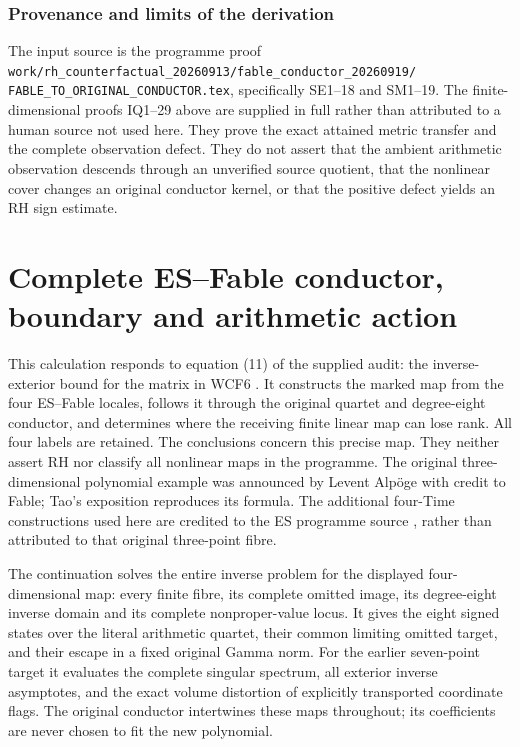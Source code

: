 \section{Provenance and limits of the derivation}
The input source is the programme proof
\texttt{work/rh\_counterfactual\_20260913/fable\_conductor\_20260919/}
\texttt{FABLE\_TO\_ORIGINAL\_CONDUCTOR.tex}, specifically SE1--18 and
SM1--19.  The finite-dimensional proofs IQ1--29 above are supplied in
full rather than attributed to a human source not used here.  They
prove the exact attained metric transfer and the complete observation
defect.  They do not assert that the ambient arithmetic observation
descends through an unverified source quotient, that the nonlinear
cover changes an original conductor kernel, or that the positive
defect yields an RH sign estimate.

\endgroup


\clearpage\begingroup
\part*{Complete ES--Fable conductor, boundary and arithmetic action}
\newtheorem{fullfableproposition}{Proposition}
\newtheorem{fullfabletheorem}{Theorem}
\newcommand{\fullfableC}{\mathbb C}
\newcommand{\fullfableR}{\mathbb R}
\newcommand{\fullfablediag}{\operatorname{diag}}
\newcommand{\fullfableord}{\operatorname{ord}}
\newcommand{\fullfablerank}{\operatorname{rank}}
\newcommand{\fullfabletr}{\operatorname{tr}}



This calculation responds to equation (11) of the supplied audit: the
inverse-exterior bound for the matrix in WCF6 \cite{fullfable:WCF}. It constructs
the marked map from the four ES--Fable locales, follows it through the
original quartet and degree-eight conductor, and determines where the
receiving finite linear map can lose rank. All four labels are retained.
The conclusions concern this precise map. They neither assert RH nor
classify all nonlinear maps in the programme.
The original three-dimensional polynomial example was announced by
Levent Alp\"oge with credit to Fable; Tao's exposition \cite{fullfable:Tao}
reproduces its formula. The additional four-Time constructions used here
are credited to the ES programme source \cite{fullfable:ES}, rather than attributed
to that original three-point fibre.

The continuation solves the entire inverse problem for the displayed
four-dimensional map: every finite fibre, its complete omitted image,
its degree-eight inverse domain and its complete nonproper-value locus.
It gives the eight signed states over the literal arithmetic quartet,
their common limiting omitted target, and their escape in a fixed
original Gamma norm. For the earlier seven-point target it evaluates
the complete singular spectrum, all exterior inverse asymptotes, and
the exact volume distortion of explicitly transported coordinate flags.
The original conductor intertwines these maps throughout; its coefficients
are never chosen to fit the new polynomial.

